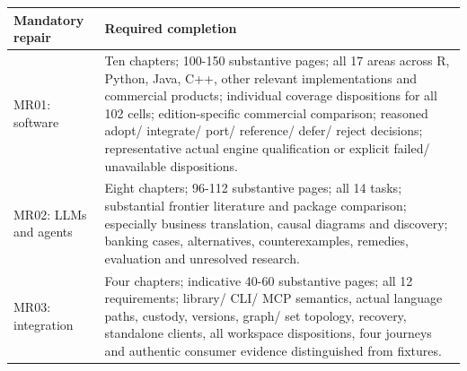 \documentclass[
  10pt,
]{article}
\begin{document}
\begin{longtable}[]{@{}>{\raggedright\arraybackslash}p{}>{\raggedright\arraybackslash}p{}@{}}
\toprule
\begin{minipage}[b]{\linewidth}\raggedright
Mandatory repair\strut
\end{minipage} & \begin{minipage}[b]{\linewidth}\raggedright
Required completion\strut
\end{minipage}\tabularnewline
\midrule
\endhead
\begin{minipage}[t]{\linewidth}\raggedright
MR01: software\strut
\end{minipage} & \begin{minipage}[t]{\linewidth}\raggedright
Ten chapters; 100-150 substantive pages; all 17 areas across R, Python,
Java, C++, other relevant implementations and commercial products;
individual coverage dispositions for all 102 cells; edition-specific
commercial comparison; reasoned adopt/ integrate/ port/ reference/
defer/ reject decisions; representative actual engine qualification or
explicit failed/ unavailable dispositions.\strut
\end{minipage}\tabularnewline
\begin{minipage}[t]{\linewidth}\raggedright
MR02: LLMs and agents\strut
\end{minipage} & \begin{minipage}[t]{\linewidth}\raggedright
Eight chapters; 96-112 substantive pages; all 14 tasks; substantial
frontier literature and package comparison; especially business
translation, causal diagrams and discovery; banking cases, alternatives,
counterexamples, remedies, evaluation and unresolved research.\strut
\end{minipage}\tabularnewline
\begin{minipage}[t]{\linewidth}\raggedright
MR03: integration\strut
\end{minipage} & \begin{minipage}[t]{\linewidth}\raggedright
Four chapters; indicative 40-60 substantive pages; all 12 requirements;
library/ CLI/ MCP semantics, actual language paths, custody, versions,
graph/ set topology, recovery, standalone clients, all workspace
dispositions, four journeys and authentic consumer evidence
distinguished from fixtures.\strut
\end{minipage}\tabularnewline
\bottomrule
\end{longtable}
\end{document}
